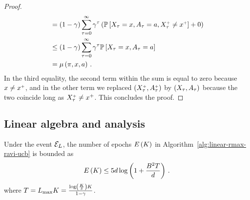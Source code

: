 \begin{proof}
\begin{align*}
    &= \left( 1 - \gamma \right) \sum_{\tau=0}^\infty \gamma^\tau \left( \mathbb{P} \left[ X_\tau = x, A_\tau = a, X_\tau^{\mathsf{\scriptscriptstyle +}} \neq x^{\mathsf{\scriptscriptstyle +}} \right] + 0 \right) \\
    &\leq \left( 1 - \gamma \right) \sum_{\tau=0}^\infty \gamma^\tau \mathbb{P} \left[ X_\tau = x, A_\tau = a \right] \\
    &= \mu \left( \pi, x, a \right)\,.
  \end{align*}
  In the third equality, the second term within the sum is equal to zero because $x \neq x^{\mathsf{\scriptscriptstyle +}}$, and in the other term we replaced $\left( X_\tau^{\mathsf{\scriptscriptstyle +}}, A_\tau^{\mathsf{\scriptscriptstyle +}} \right)$ by $\left( X_\tau, A_\tau \right)$ because the two coincide long as $X^{\mathsf{\scriptscriptstyle +}}_\tau \neq x^+$. This concludes the proof.
\end{proof}

\subsection{Linear algebra and analysis}

\begin{lemma} \label{lemma:number-epochs-bound}
    Under the event $\mathcal{E}_L$, the number of epochs $E \left( K \right)$ in Algorithm~\ref{alg:linear-rmax-ravi-ucb} is bounded as
    \begin{equation*}
      E \left( K \right) \leq 5 d \log \left( 1 + \frac{B^2 T}{d} \right)\,.
    \end{equation*}
    where $T = L_{\max} K = \frac{\log \left( \frac{K}{\delta} \right) K}{1 - \gamma}$.
\end{lemma}

